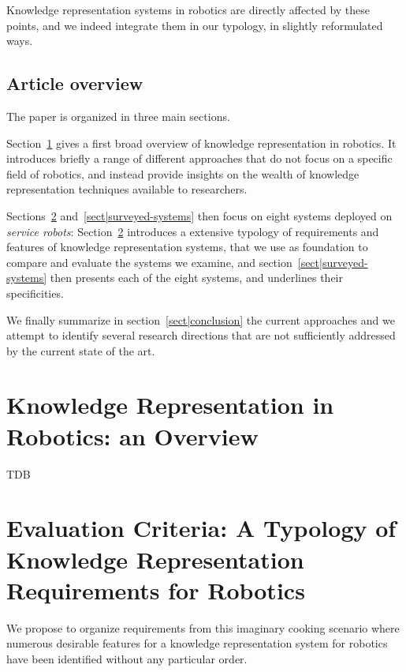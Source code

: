 \documentclass{IEEEtran}
\begin{document}
Knowledge representation systems in robotics are directly affected by these
points, and we indeed integrate them in our typology, in slightly reformulated
ways.

\subsection{Article overview}
\label{sect|overview}

The paper is organized in three main sections.

Section~\ref{sect|krsoverview} gives a first broad overview of knowledge
representation in robotics. It introduces briefly a range of different
approaches that do not focus on a specific field of robotics, and instead
provide insights on the wealth of knowledge representation techniques available
to researchers.

Sections~\ref{sect|features} and~\ref{sect|surveyed-systems} then focus on eight
systems deployed on \emph{service robots}: Section~\ref{sect|features}
introduces a extensive typology of requirements and features of knowledge
representation systems, that we use as foundation to compare and evaluate the
systems we examine, and section~\ref{sect|surveyed-systems} then presents each
of the eight systems, and underlines their specificities.

We finally summarize in section~\ref{sect|conclusion} the current approaches and
we attempt to identify several research directions that are not sufficiently
addressed by the current state of the art.

\section{Knowledge Representation in Robotics: an Overview}
\label{sect|krsoverview}

TDB

\section{Evaluation Criteria: A Typology of Knowledge Representation Requirements for Robotics}
\label{sect|features}

We propose to organize requirements from this imaginary cooking scenario where
numerous desirable features for a knowledge representation system for robotics
have been identified without any particular order.
\end{document}
